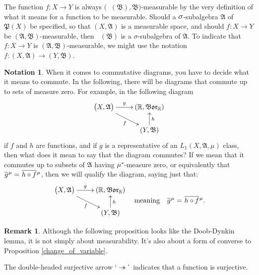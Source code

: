 \documentclass[
twoside=true,
paper=letter,
fontsize=9pt,
pagesize=auto,
leqno,
openany,
headsepline,
overfullrule,
]{scrbook}
\theoremstyle{plain}
\theoremstyle{plain}
\theoremstyle{definition}
\newtheorem{rmk}[thm]{Remark}
\newtheorem{notn}[thm]{Notation}
\theoremstyle{bfnoteitalic}
\theoremstyle{bfnoteroman}
\newcommand{\sigalg}[1]{\mathfrak{#1}}
\newcommand{\borel}{\mathfrak{Bor}}
\newcommand{\textsigma}{\hbox{\large{$\sigma$}}\kern-1pt}
\newcommand{\preimage}[1]{\mathop{#1^{\leftarrow}}}
\newcommand{\R}{\mathbb{R}}
\newcommand{\sigmaalgebra}{\sigalg{A}}
\newcommand{\sigmaalgebraii}{\sigalg{B}}
\newcommand{\powerset}{\mathfrak{P}}
\newcommand{\kernast}{\ast\kern-1pt}
\newcommand{\Pstar}{\measure^\kernast}
\newcommand{\Lone}{L_1(\measurespace, \sigmaalgebra, \measure)}
\newcommand{\measurespace}{X}
\newcommand{\measurespaceii}{Y}
\newcommand{\measure}{\mu}
\newcommand*\xbar[1]{%
   \hbox{%
     \vbox{%
       \hrule height 0.4pt %
       \kern0.4ex%
       \hbox{%
         \ensuremath{#1}%
       }%
     }%
   }%
}
\newcommand{\lebclass}[1]{\hspace{.5pt}\xbar{#1}\hspace{0.5pt}}
\newcommand{\ellclass}[2]{\lebclass{#1}^{#2}}
\begin{document}
The function $f: \measurespace\to\measurespaceii$ is always
$\bigl(\preimage{f}(\sigmaalgebraii), \sigmaalgebraii\bigr)$\hyp{}measurable by the very definition of what it means for a function to be measurable.
Should a $\textsigma$-subalgebra $\sigmaalgebra$ of $\powerset(\measurespace)$ be specified, so that $(\measurespace, \sigmaalgebra)$ is a measurable space, and should $f:\measurespace\to\measurespaceii$ be 
$(\sigmaalgebra, \sigmaalgebraii)$\hyp{}measurable, then $\preimage{f}(\sigmaalgebraii)$ is a \textsigma-subalgebra of $\sigmaalgebra$. 
To indicate that $f:\measurespace\to\measurespaceii$ is 
$(\sigmaalgebra, \sigmaalgebraii)$\hyp{}measurable, we might use the notation $f:(\measurespace,\sigmaalgebra)\to(\measurespaceii,\sigmaalgebraii)$.



\begin{notn}
When it comes to commutative diagrams, you have to decide what it means to commute.  In the following, there will be diagrams that commute up to sets of measure zero.  For example, in the following diagram
\[
\xymatrix@R=16pt{ 
\bigl( \measurespace, \sigmaalgebra \bigr) \ar[r]^-{g} 
\ar[dr]_{f}
&
(\R,\borel_\R)  
\\
&
(\measurespaceii, \sigmaalgebraii) \ar[u]_{h}
\\
}
\]
if $f$ and $h$ are functions, and if $g$ is a representative of an 
$\Lone$ class, then what does it mean to say that the diagram commutes? If we mean that it commutes up to subsets of $\sigmaalgebra$ having $\Pstar$-measure zero, or equivalently that 
$\ellclass{g}{\measure}=\ellclass{h\circ f}{\measure}$, then we will qualify the diagram, saying just that:
\[
\begin{gathered}
\xymatrix@R=16pt{ 
\bigl( \measurespace, \sigmaalgebra \bigr) \ar[r]^-{g} 
\ar[dr]_{f}
&
(\R,\borel_\R)  
\\
&
(\measurespaceii, \sigmaalgebraii) \ar[u]_{h}
\\
}
\end{gathered}
\quad
\text{meaning}
\quad
\ellclass{g}{\measure}=\ellclass{h\circ f}{\measure}.
\]
\end{notn}


\begin{rmk}
Although the following proposition looks like the Doob-Dynkin lemma, it is not simply about measurability. It's also about a form of converse to Proposition \ref{change_of_variable}.

The double-headed surjective arrow \lq$\twoheadrightarrow$\rq\ indicates that a function is surjective.
\end{rmk}
\end{document}
